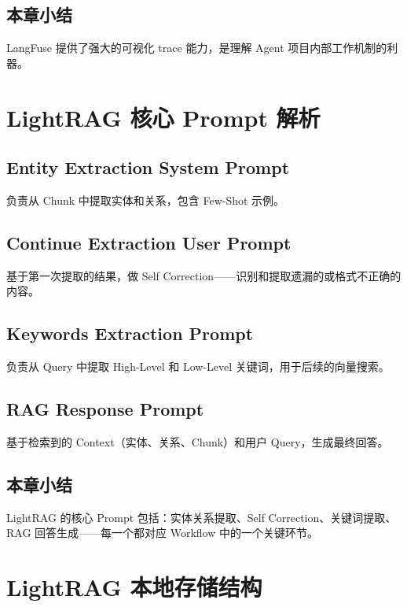 \documentclass[a4paper]{article}
\begin{document}
\subsection{本章小结}

LangFuse 提供了强大的可视化 trace 能力，是理解 Agent 项目内部工作机制的利器。

\section{LightRAG 核心 Prompt 解析}

\subsection{Entity Extraction System Prompt}

负责从 Chunk 中提取实体和关系，包含 Few-Shot 示例。

\subsection{Continue Extraction User Prompt}

基于第一次提取的结果，做 Self Correction——识别和提取遗漏的或格式不正确的内容。

\subsection{Keywords Extraction Prompt}

负责从 Query 中提取 High-Level 和 Low-Level 关键词，用于后续的向量搜索。

\subsection{RAG Response Prompt}

基于检索到的 Context（实体、关系、Chunk）和用户 Query，生成最终回答。

\subsection{本章小结}

LightRAG 的核心 Prompt 包括：实体关系提取、Self Correction、关键词提取、RAG 回答生成——每一个都对应 Workflow 中的一个关键环节。

\section{LightRAG 本地存储结构}
\end{document}
